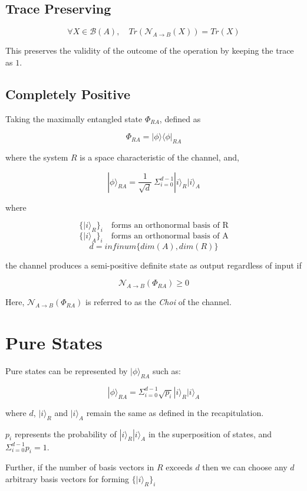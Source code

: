 \documentclass{article}
\begin{document}
\subsection{Trace Preserving}

\[\forall X \in \mathcal{B}(A),\quad Tr(\mathcal{N}_{A \rightarrow B}(X))=Tr(X) \]

This preserves the validity of the outcome of the operation by keeping the trace as $1$.

\subsection{Completely Positive}

Taking the maximally entangled state $\Phi_{RA}$, defined as

\[\Phi_{RA} = | \phi \rangle \langle \phi | _{RA}\]

where the system $R$ is a space characteristic of the channel, and,

\[| \phi \rangle _{RA} = \frac{1}{\sqrt{d}}\ \Sigma^{d-1}_{i=0} | i \rangle_R | i \rangle_A \]

where

\[ \{| i \rangle_R \}_i \quad \textrm{forms an orthonormal basis of R} \]
\[ \{| i \rangle_A \}_i \quad \textrm{forms an orthonormal basis of A} \]
\[d = infinum\{ dim(A), dim(R)\}\]

the channel produces a semi-positive definite state as output regardless of input if

\[ \mathcal{N}_{A \rightarrow B}(\Phi_{RA}) 	\geq 0 \]

Here, $\mathcal{N}_{A \rightarrow B}(\Phi_{RA})$ is referred to as the \emph{Choi} of the channel.

\section{Pure States}

Pure states can be represented by $| \phi \rangle _{RA}$ such as:

\[| \phi \rangle _{RA} = \Sigma^{d-1}_{i=0} \sqrt{p_i}| i \rangle_R | i \rangle_A \]

where $d$, $| i \rangle_R$ and $| i \rangle_A$ remain the same as defined in the recapitulation.

$p_i$ represents the probability of $| i \rangle_R | i \rangle_A$ in the superposition of states, and $\Sigma^{d-1}_{i=0} {p_i} = 1$.

\noindent Further, if the number of basis vectors in $R$ exceeds $d$ then we can choose any $d$ arbitrary basis vectors for forming
$\{| i \rangle_R \}_i$
\end{document}
